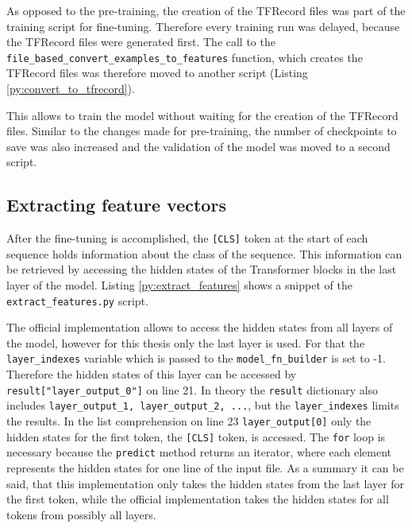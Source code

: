 As opposed to the pre-training, the creation of the TFRecord files was part of the training script for fine-tuning.
Therefore every training run was delayed, because the TFRecord files were generated first.
The call to the \texttt{file\_based\_convert\_examples\_to\_features} function, which creates the TFRecord files was therefore moved to another script (Listing \ref{py:convert_to_tfrecord}).

This allows to train the model without waiting for the creation of the TFRecord files.
Similar to the changes made for pre-training, the number of checkpoints to save was also increased and the validation of the model was moved to a second script.

\subsection{Extracting feature vectors}
\label{subsec:extracting_feature_vectors}
After the fine-tuning is accomplished, the \texttt{[CLS]} token at the start of each sequence holds information about the class of the sequence.
This information can be retrieved by accessing the hidden states of the Transformer blocks in the last layer of the model.
Listing \ref{py:extract_features} shows a snippet of the \texttt{extract\_features.py} script.

The official implementation allows to access the hidden states from all layers of the model, however for this thesis only the last layer is used.
For that the \texttt{layer\_indexes} variable which is passed to the \texttt{model\_fn\_builder} is set to -1.
Therefore the hidden states of this layer can be accessed by \texttt{result["layer\_output\_0"]} on line 21.
In theory the \texttt{result} dictionary also includes \texttt{layer\_output\_1, layer\_output\_2, ...}, but the \texttt{layer\_indexes} limits the results.
In the list comprehension on line 23 \texttt{layer\_output[0]} only the hidden states for the first token, the \texttt{[CLS]} token, is accessed.
The \texttt{for} loop is necessary because the \texttt{predict} method returns an iterator, where each element represents the hidden states for one line of the input file.
As a summary it can be said, that this implementation only takes the hidden states from the last layer for the first token, while the official implementation takes the hidden states for all tokens from possibly all layers.


